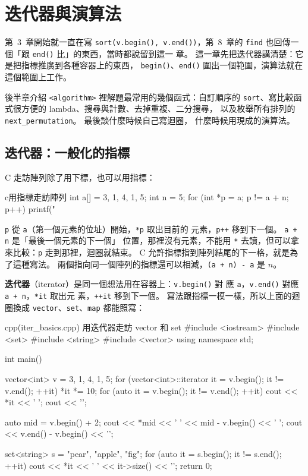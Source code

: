 \chapter{迭代器與演算法}
\label{ch:iter-algo}

第~3~章開始就一直在寫 \texttt{sort(v.begin(), v.end())}，第~8~章的
\texttt{find} 也回傳一個「跟 \texttt{end()} 比」的東西，當時都說留到這一
章。 這一章先把迭代器講清楚：它是把指標推廣到各種容器上的東西，
\texttt{begin()}、\texttt{end()} 圍出一個範圍，演算法就在這個範圍上工作。

後半章介紹 \texttt{<algorithm>} 裡解題最常用的幾個函式：自訂順序的
\texttt{sort}、寫比較函式很方便的 lambda、搜尋與計數、去掉重複、二分搜尋，
以及枚舉所有排列的 \texttt{next\_permutation}。 最後談什麼時候自己寫迴圈，
什麼時候用現成的演算法。

\section{迭代器：一般化的指標}
\label{sec:iterators}

\begin{crecap}[用指標走訪陣列]
C 走訪陣列除了用下標，也可以用指標：

\begin{code}{c}{用指標走訪陣列}
int a[] = {3, 1, 4, 1, 5};
int n = 5;
for (int *p = a; p != a + n; p++) {
    printf("%
}
\end{code}

\texttt{p} 從 \texttt{a}（第一個元素的位址）開始，\texttt{*p} 取出目前的
元素，\texttt{p++} 移到下一個。 \texttt{a + n} 是「最後一個元素的下一個」
位置，那裡沒有元素，不能用 \texttt{*} 去讀，但可以拿來比較：\texttt{p}
走到那裡，迴圈就結束。 C 允許指標指到陣列結尾的下一格，就是為了這種寫法。
兩個指向同一個陣列的指標還可以相減，\texttt{(a + n) - a} 是 $n$。
\end{crecap}

\textbf{迭代器}（iterator）是同一個想法用在容器上：\texttt{v.begin()} 對
應 \texttt{a}，\texttt{v.end()} 對應 \texttt{a + n}，\texttt{*it} 取出元
素，\texttt{++it} 移到下一個。 寫法跟指標一模一樣，所以上面的迴圈換成
\texttt{vector}、\texttt{set}、\texttt{map} 都能照寫：

\begin{example}[label=ex:iter-basics]{cpp}{(iter\_basics.cpp) 用迭代器走訪 vector 和 set}
#include <iostream>
#include <set>
#include <string>
#include <vector>
using namespace std;

int main() {
    vector<int> v = {3, 1, 4, 1, 5};
    for (vector<int>::iterator it = v.begin(); it != v.end();
         ++it) {
        *it *= 10;
    }
    for (auto it = v.begin(); it != v.end(); ++it) {
        cout << *it << ' ';
    }
    cout << '\n';

    auto mid = v.begin() + 2;
    cout << *mid << ' ' << mid - v.begin() << ' ';
    cout << v.end() - v.begin() << '\n';

    set<string> s = {"pear", "apple", "fig"};
    for (auto it = s.begin(); it != s.end(); ++it) {
        cout << *it << ' ' << it->size() << '\n';
    }
    return 0;
}
\end{example}

